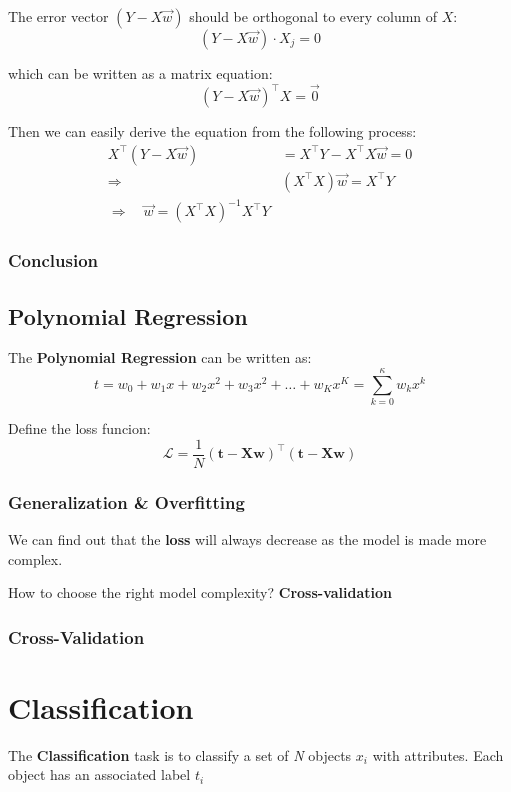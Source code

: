 \documentclass[12pt]{article}
\begin{document}
The error vector $(Y-X \vec{w})$ should be orthogonal to every column of $X$:
$$
(Y-X \vec{w}) \cdot X_{j}=0
$$

which can be written as a matrix equation:
$$
(Y-X \vec{w})^{\top} X=\overrightarrow{0}
$$

Then we can easily derive the equation from the following process:
$$
\begin{aligned} X^{\top}(Y-X \vec{w}) &=X^{\top} Y-X^{\top} X \vec{w}=0 \\ \Longrightarrow &\left(X^{\top} X\right) \vec{w}=X^{\top} Y \\ \Longrightarrow \quad \vec{w}=\left(X^{\top} X\right)^{-1} X^{\top} Y \end{aligned}
$$
\subsubsection{Conclusion}

\subsection{Polynomial Regression}

The \textbf{Polynomial Regression} can be written as:
$$
t=w_{0}+w_{1} x+w_{2} x^{2}+w_{3} x^{2}+\ldots+w_{K} x^{K}=\sum_{k=0}^{\kappa} w_{k} x^{k}
$$

Define the loss funcion:
$$
\mathcal{L}=\frac{1}{N}(\mathbf{t}-\mathbf{X} \mathbf{w})^{\top}(\mathbf{t}-\mathbf{X} \mathbf{w})
$$
\subsubsection{Generalization \& Overfitting}

We can find out that the \textbf{loss} will always decrease
as the model is made more complex.

How to choose the right model complexity?
\textbf{Cross-validation}

\subsubsection{Cross-Validation}

\section{Classification}

The \textbf{Classification} task is to classify
a set of \textit{N} objects $x_i$ with attributes.
Each object has an associated label $t_i$
\end{document}

